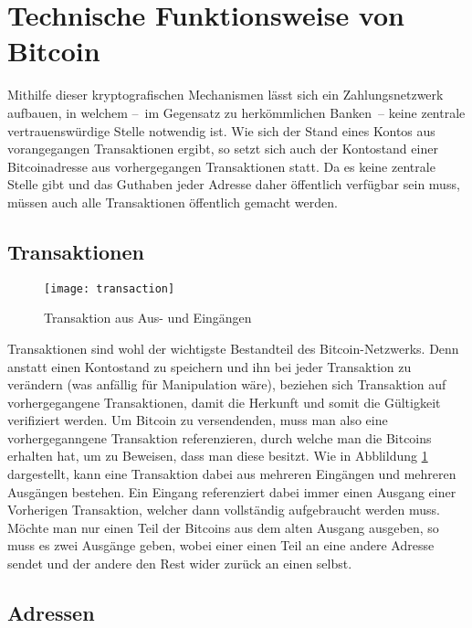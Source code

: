 \section{Technische Funktionsweise von Bitcoin}
\label{sec:mechanics}

Mithilfe dieser kryptografischen Mechanismen lässt sich ein Zahlungsnetzwerk aufbauen, in welchem --~im Gegensatz zu herkömmlichen Banken~-- keine zentrale vertrauenswürdige Stelle notwendig ist.
Wie sich der Stand eines Kontos aus vorangegangen Transaktionen ergibt, so setzt sich auch der Kontostand einer Bitcoinadresse aus vorhergegangen Transaktionen statt.
Da es keine zentrale Stelle gibt und das Guthaben jeder Adresse daher öffentlich verfügbar sein muss, müssen auch alle Transaktionen öffentlich gemacht werden.

\subsection{Transaktionen}

\begin{figure}
    \begin{center}
		\texttt{[image: transaction]}
    	\caption{Transaktion aus Aus- und Eingängen \parencite[5]{nakamoto}}
    	\label{fig:transaction}
    \end{center}
\end{figure}

Transaktionen sind wohl der wichtigste Bestandteil des Bitcoin-Netzwerks.
Denn anstatt einen Kontostand zu speichern und ihn bei jeder Transaktion zu verändern (was anfällig für Manipulation wäre), beziehen sich Transaktion auf vorhergegangene Transaktionen, damit die Herkunft und somit die Gültigkeit verifiziert werden.
Um Bitcoin zu versendenden, muss man also eine vorhergeganngene Transaktion referenzieren, durch welche man die Bitcoins erhalten hat, um zu Beweisen, dass man diese besitzt.
Wie in Abblildung \ref{fig:transaction} dargestellt, kann eine Transaktion dabei aus mehreren Eingängen und mehreren Ausgängen bestehen.
Ein Eingang referenziert dabei immer einen Ausgang einer Vorherigen Transaktion, welcher dann vollständig aufgebraucht werden muss.
Möchte man nur einen Teil der Bitcoins aus dem alten Ausgang ausgeben, so muss es zwei Ausgänge geben, wobei einer einen Teil an eine andere Adresse sendet und der andere den Rest wider zurück an einen selbst.

\subsection{Adressen}

